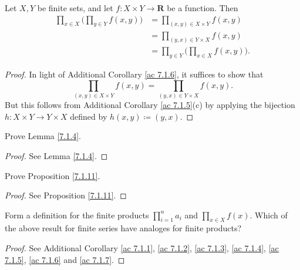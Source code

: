 \begin{additional corollary}\label{ac 7.1.7}
Let \(X, Y\) be finite sets, and let \(f : X \times Y \to \mathbf{R}\) be a function.
Then
\begin{align*}
    \prod_{x \in X} \bigg(\prod_{y \in Y} f(x, y)\bigg) & = \prod_{(x, y) \in X \times Y} f(x, y)                \\
                                                        & = \prod_{(y, x) \in Y \times X} f(x, y)                \\
                                                        & = \prod_{y \in Y} \bigg(\prod_{x \in X} f(x, y)\bigg).
\end{align*}
\end{additional corollary}

\begin{proof}
    In light of Additional Corollary \ref{ac 7.1.6}, it suffices to show that
    \[
        \prod_{(x, y) \in X \times Y} f(x, y) = \prod_{(y, x) \in Y \times X} f(x, y).
    \]
    But this follows from Additional Corollary \ref{ac 7.1.5}(c) by applying the bijection \(h : X \times Y \to Y \times X\) defined by \(h(x, y) \coloneqq (y, x)\).
\end{proof}

\exercisesection

\begin{exercise}\label{ex 7.1.1}
    Prove Lemma \ref{7.1.4}.
\end{exercise}

\begin{proof}
    See Lemma \ref{7.1.4}.
\end{proof}

\begin{exercise}\label{ex 7.1.2}
    Prove Proposition \ref{7.1.11}.
\end{exercise}

\begin{proof}
    See Proposition \ref{7.1.11}.
\end{proof}

\begin{exercise}\label{ex 7.1.3}
    Form a definition for the finite products \(\prod_{i = 1}^n a_i\) and \(\prod_{x \in X} f(x)\).
    Which of the above result for finite series have analoges for finite products?
\end{exercise}

\begin{proof}
    See Additional Corollary \ref{ac 7.1.1}, \ref{ac 7.1.2}, \ref{ac 7.1.3}, \ref{ac 7.1.4}, \ref{ac 7.1.5}, \ref{ac 7.1.6} and \ref{ac 7.1.7}.
\end{proof}

